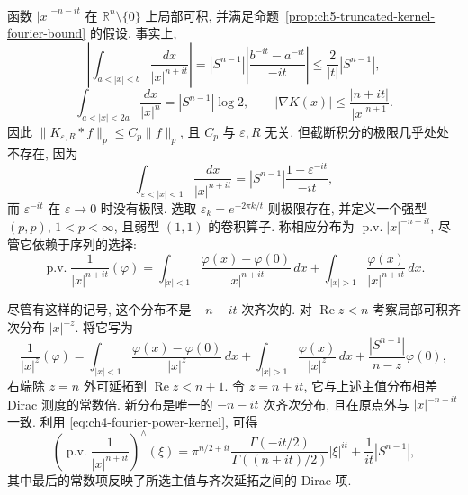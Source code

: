 \begin{Example}[$K(x)=|x|^{-n-it}$ 的应用]
\label{ex:ch5-complex-power-kernel}
函数 $|x|^{-n-it}$ 在 $\mathbb R^n\setminus\{0\}$ 上局部可积, 并满足命题~\ref{prop:ch5-truncated-kernel-fourier-bound} 的假设. 事实上,
\[
 \left|\int_{a<|x|<b}\frac{dx}{|x|^{n+it}}\right|
 =|S^{n-1}|\left|\frac{b^{-it}-a^{-it}}{-it}\right|
 \le\frac2{|t|}|S^{n-1}|,
\]
\[
 \int_{a<|x|<2a}\frac{dx}{|x|^n}=|S^{n-1}|\log2,
 \qquad
 |\nabla K(x)|\le\frac{|n+it|}{|x|^{n+1}}.
\]
因此 $\|K_{\varepsilon,R}*f\|_p\le C_p\|f\|_p$, 且 $C_p$ 与 $\varepsilon,R$ 无关. 但截断积分的极限几乎处处不存在, 因为
\[
 \int_{\varepsilon<|x|<1}\frac{dx}{|x|^{n+it}}
 =|S^{n-1}|\frac{1-\varepsilon^{-it}}{-it},
\]
而 $\varepsilon^{-it}$ 在 $\varepsilon\to0$ 时没有极限. 选取 $\varepsilon_k=e^{-2\pi k/t}$ 则极限存在, 并定义一个强型 $(p,p)$, $1<p<\infty$, 且弱型 $(1,1)$ 的卷积算子. 称相应分布为 $\operatorname{p.v.}|x|^{-n-it}$, 尽管它依赖于序列的选择:
\[
 \operatorname{p.v.}\frac1{|x|^{n+it}}(\varphi)
 =\int_{|x|<1}\frac{\varphi(x)-\varphi(0)}{|x|^{n+it}}\,dx
 +\int_{|x|>1}\frac{\varphi(x)}{|x|^{n+it}}\,dx.
\]
\end{Example}

\hypertarget{chapter-05-page-110}{}
尽管有这样的记号, 这个分布不是 $-n-it$ 次齐次的. 对 $\operatorname{Re}z<n$ 考察局部可积齐次分布 $|x|^{-z}$. 将它写为
\[
 \frac1{|x|^z}(\varphi)
 =\int_{|x|<1}\frac{\varphi(x)-\varphi(0)}{|x|^z}\,dx
 +\int_{|x|>1}\frac{\varphi(x)}{|x|^z}\,dx
 +\frac{|S^{n-1}|}{n-z}\varphi(0),
\]
右端除 $z=n$ 外可延拓到 $\operatorname{Re}z<n+1$. 令 $z=n+it$, 它与上述主值分布相差 Dirac 测度的常数倍. 新分布是唯一的 $-n-it$ 次齐次分布, 且在原点外与 $|x|^{-n-it}$ 一致. 利用 \eqref{eq:ch4-fourier-power-kernel}, 可得
\[
 \left(\operatorname{p.v.}\frac1{|x|^{n+it}}\right)^{\!\wedge}(\xi)
 =\pi^{n/2+it}\frac{\Gamma(-it/2)}{\Gamma((n+it)/2)}
 |\xi|^{it}+\frac1{it}|S^{n-1}|,
\]
其中最后的常数项反映了所选主值与齐次延拓之间的 Dirac 项.
